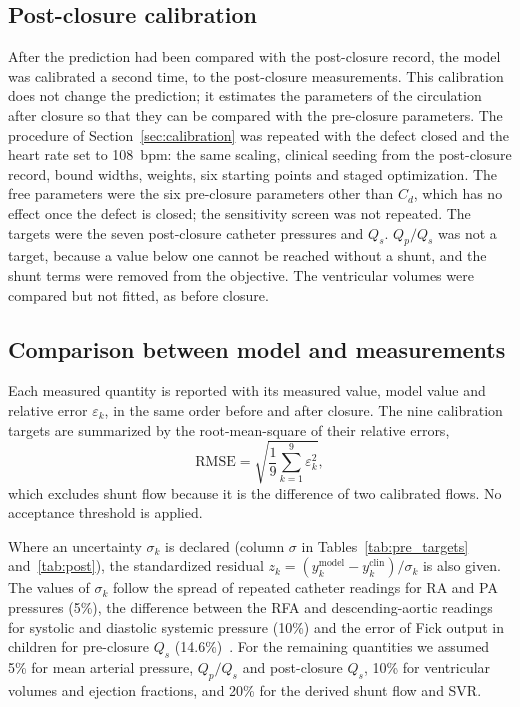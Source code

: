 \subsection{Post-closure calibration}
\label{sec:post_calib_methods}
After the prediction had been compared with the post-closure record, the model was calibrated a second time, to the post-closure measurements. This calibration does not change the prediction; it estimates the parameters of the circulation after closure so that they can be compared with the pre-closure parameters. The procedure of Section~\ref{sec:calibration} was repeated with the defect closed and the heart rate set to 108~bpm: the same scaling, clinical seeding from the post-closure record, bound widths, weights, six starting points and staged optimization. The free parameters were the six pre-closure parameters other than $C_d$, which has no effect once the defect is closed; the sensitivity screen was not repeated. The targets were the seven post-closure catheter pressures and $Q_s$. $Q_p/Q_s$ was not a target, because a value below one cannot be reached without a shunt, and the shunt terms were removed from the objective. The ventricular volumes were compared but not fitted, as before closure.

\FloatBarrier
\subsection{Comparison between model and measurements}
\label{sec:comparison}
\label{sec:statistics}
Each measured quantity is reported with its measured value, model value and relative error $\varepsilon_k$, in the same order before and after closure. The nine calibration targets are summarized by the root-mean-square of their relative errors,
\begin{equation}
\mathrm{RMSE} = \sqrt{\frac{1}{9}\sum_{k=1}^{9}\varepsilon_k^{2}},
\label{eq:rmse}
\end{equation}
which excludes shunt flow because it is the difference of two calibrated flows. No acceptance threshold is applied.

Where an uncertainty $\sigma_k$ is declared (column $\sigma$ in Tables~\ref{tab:pre_targets} and~\ref{tab:post}), the standardized residual $z_k = (y_k^{\mathrm{model}} - y_k^{\mathrm{clin}})/\sigma_k$ is also given. The values of $\sigma_k$ follow the spread of repeated catheter readings for RA and PA pressures (5\%), the difference between the RFA and descending-aortic readings for systolic and diastolic systemic pressure (10\%) and the error of Fick output in children for pre-closure $Q_s$ (14.6\%)~\cite{Ralston2023}. For the remaining quantities we assumed 5\% for mean arterial pressure, $Q_p/Q_s$ and post-closure $Q_s$, 10\% for ventricular volumes and ejection fractions, and 20\% for the derived shunt flow and SVR.

